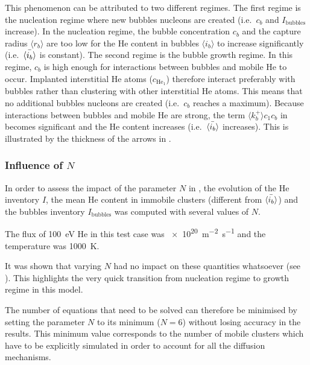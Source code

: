 This phenomenon can be attributed to two different regimes.
The first regime is the nucleation regime where new bubbles nucleons are created (i.e.\ $c_b$ and $I_\mathrm{bubbles}$ increase).
In the nucleation regime, the bubble concentration $c_b$ and the capture radius $\langle r_b \rangle$ are too low for the He content in bubbles $\langle i_b \rangle$ to increase significantly (i.e.\ $\Bar{\langle i_b \rangle}$ is constant).
The second regime is the bubble growth regime.
In this regime, $c_b$ is high enough for interactions between bubbles and mobile He to occur.
Implanted interstitial He atoms ($c_{\mathrm{He}_1}$) therefore interact preferably with bubbles rather than clustering with other interstitial He atoms.
This means that no additional bubbles nucleons are created (i.e.\ $c_b$ reaches a maximum).
Because interactions between bubbles and mobile He are strong, the term $\langle k_b^+ \rangle c_1 c_b$ in  becomes significant and the He content increases (i.e.\ $\Bar{\langle i_b \rangle}$ increases).
This is illustrated by the thickness of the arrows in .


\subsubsection{Influence of $N$} 
In order to assess the impact of the parameter $N$ in , the evolution of the He inventory $I$, the mean He content in immobile clusters (different from $\Bar{\langle i_b \rangle}$) and the bubbles inventory $I_\mathrm{bubbles}$ was computed with several values of $N$.

The flux of \SI{100}{eV} He in this test case was \SI{e20}{m^{-2} s^{-1}} and the temperature was \SI{1000}{K}. 

It was shown that varying $N$ had no impact on these quantities whatsoever (see ).
This highlights the very quick transition from nucleation regime to growth regime in this model.

The number of equations that need to be solved can therefore be minimised by setting the parameter $N$ to its minimum ($N=6$) without losing accuracy in the results.
This minimum value corresponds to the number of mobile clusters which have to be explicitly simulated in order to account for all the diffusion mechanisms.


